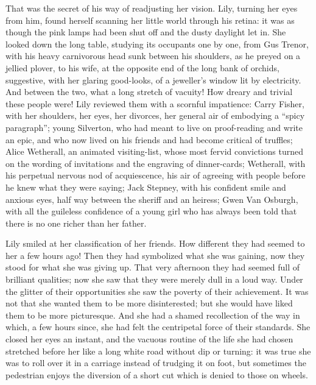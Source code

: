 \documentclass[12pt,a4paper]{book}
\begin{document}
That was the secret of his way of readjusting her vision. Lily,
turning her eyes from him, found herself scanning her little
world through his retina: it was as though the pink lamps had
been shut off and the dusty daylight let in. She looked down the
long table, studying its occupants one by one, from Gus Trenor,
with his heavy carnivorous head sunk between his shoulders, as he
preyed on a jellied plover, to his wife, at the opposite end of
the long bank of orchids, suggestive, with her glaring
good-looks, of a jeweller's window lit by electricity. And
between the two, what a long stretch of vacuity! How dreary and
trivial these people were! Lily reviewed them with a scornful
impatience: Carry Fisher, with her shoulders, her eyes, her
divorces, her general air of embodying a ``spicy paragraph''; young
Silverton, who had meant to live on proof-reading and write an
epic, and who now lived on his friends and had become critical of
truffles; Alice Wetherall, an animated visiting-list, whose most
fervid convictions turned on the wording of invitations and the
engraving of dinner-cards; Wetherall, with his perpetual nervous
nod of acquiescence, his air of agreeing with people before he
knew what they were saying; Jack Stepney, with his confident
smile and anxious eyes, half way between the sheriff and an
heiress; Gwen Van Osburgh, with all the guileless confidence of a
young girl who has always been told that there is no one richer
than her father.





Lily smiled at her classification of her friends. How different
they had seemed to her a few hours ago! Then they had symbolized
what she was gaining, now they stood for what she was giving up. 
That very afternoon they had seemed full of brilliant qualities;
now she saw that they were merely dull in a loud way. Under the
glitter of their opportunities she saw the poverty of their
achievement. It was not that she wanted them to be more
disinterested; but she would have liked them to be more
picturesque. And she had a shamed recollection of the way
in which, a few hours since, she had felt the centripetal force
of their standards. She closed her eyes an instant, and the
vacuous routine of the life she had chosen stretched before her
like a long white road without dip or turning: it was true she
was to roll over it in a carriage instead of trudging it on foot,
but sometimes the pedestrian enjoys the diversion of a short cut
which is denied to those on wheels.
\end{document}
